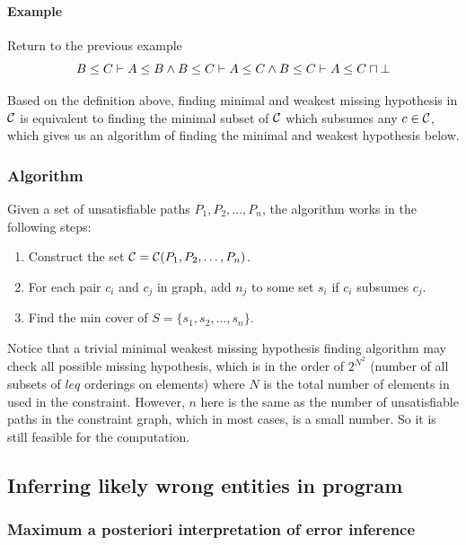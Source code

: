 \paragraph{Example} Return to the previous example \[B\leq C \vdash
A\leq B \land B\leq C \vdash A\leq C \land B\leq C \vdash A\leq
C\sqcap \bot \]

Based on the definition above, finding minimal and weakest missing
hypothesis in $\mathcal{C}$ is equivalent to finding the minimal subset
of $\mathcal{C}$ which subsumes any $c\in \mathcal{C}$, which gives us an
algorithm of finding the minimal and weakest hypothesis below.

\subsubsection{Algorithm}

Given a set of unsatisfiable paths $P_1, P_2, \dots, P_n$, the
algorithm works in the following steps:

\begin{enumerate}
\item Construct the set $\mathcal{C} = \mathcal{C}(P_1, P_2, \dots,
P_n)$.

\item For each pair $c_i$ and $c_j$ in graph, add $n_j$ to some set
$s_i$ if $c_i$ subsumes $c_j$.

\item Find the min cover of $S=\{s_1, s_2, \dots, s_n\}$.
\end{enumerate}

Notice that a trivial minimal weakest missing hypothesis finding
algorithm may check all possible missing hypothesis, which is in the
order of $2^{N^2}$ (number of all subsets of $leq$ orderings on
elements) where $N$ is the total number of elements in used in the
constraint. However, $n$ here is the same as the number of
unsatisfiable paths in the constraint graph, which in most cases, is a
small number. So it is still feasible for the computation.

\subsection{Inferring likely wrong entities in program}
\label{sec:mapmodel}

\subsubsection{Maximum a posteriori interpretation of error inference}


